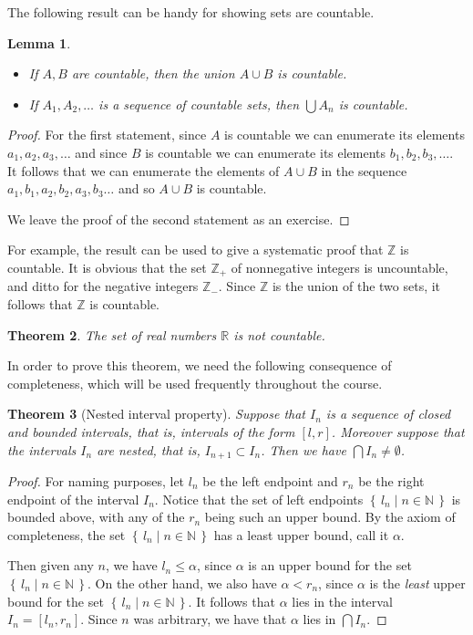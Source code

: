 \documentclass[11pt,oneside]{amsbook}
\newcommand{\set}[1]{\left\{\,#1\,\right\}}
\newcommand{\NN}{\mathbb N}
\newcommand{\ZZ}{\mathbb Z}
\newcommand{\RR}{\mathbb R}
\theoremstyle{definition}
\theoremstyle{plain}
\newtheorem{thm}{Theorem}[section]
\newtheorem{lem}[thm]{Lemma}
\theoremstyle{definition}
\theoremstyle{remark}
\numberwithin{equation}{section}
\numberwithin{figure}{section}
\begin{document}
The following result can be handy for showing sets are countable.

\begin{lem}
  \begin{itemize}
  \item If $A,B$ are countable, then the union $A\cup B$ is countable.
  \item If $A_1,A_2,\ldots$ is a sequence of countable sets, then $\bigcup A_n$ is countable.
  \end{itemize}
\end{lem}

\begin{proof}
  For the first statement, since $A$ is countable we can enumerate its elements $a_1,a_2,a_3,\ldots$ and since $B$ is countable we can enumerate its elements $b_1,b_2,b_3,\ldots$. It follows that we can enumerate the elements of $A\cup B$ in the sequence $a_1,b_1,a_2,b_2,a_3,b_3\ldots$ and so $A\cup B$ is countable.

  We leave the proof of the second statement as an exercise.
\end{proof}

For example, the result can be used to give a systematic proof that $\ZZ$ is countable. It is obvious that the set $\ZZ_+$ of nonnegative integers is uncountable, and ditto for the negative integers $\ZZ_-$. Since $\ZZ$ is the union of the two sets, it follows that $\ZZ$ is countable.

\begin{thm}
  \label{thm:reals-uncountable}
  The set of real numbers $\RR$ is \emph{not} countable.
\end{thm}

In order to prove this theorem, we need the following consequence of completeness, which will be used frequently throughout the course.

\begin{thm}[Nested interval property]
  Suppose that $I_n$ is a sequence of closed and bounded intervals, that is, intervals of the form $[l,r]$. Moreover suppose that the intervals $I_n$ are nested, that is, $I_{n+1}\subset I_n$. Then we have $\bigcap I_n\neq\emptyset$.
\end{thm}

\begin{proof}
  For naming purposes, let $l_n$ be the left endpoint and $r_n$ be the right endpoint of the interval $I_n$. Notice that the set of left endpoints $\set{l_n\mid n\in\NN}$ is bounded above, with any of the $r_n$ being such an upper bound. By the axiom of completeness, the set $\set{l_n\mid n\in\NN}$ has a least upper bound, call it $\alpha$.

  Then given any $n$, we have $l_n\leq\alpha$, since $\alpha$ is an upper bound for the set $\set{l_n\mid n\in\NN}$. On the other hand, we also have $\alpha<r_n$, since $\alpha$ is the \emph{least} upper bound for the set $\set{l_n\mid n\in\NN}$. It follows that $\alpha$ lies in the interval $I_n=[l_n,r_n]$. Since $n$ was arbitrary, we have that $\alpha$ lies in $\bigcap I_n$.
\end{proof}
\end{document}
